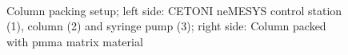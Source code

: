 \begin{figure}[h]
          \begin{subfigure}{0.49\textwidth}
                  \flushleft
          \end{subfigure}\hfill
        \begin{subfigure}{0.49\textwidth}
                \flushright
        \end{subfigure}
        \\
        
        \caption[Column packing setup]{Column packing setup; left side: CETONI neMESYS control station (1), column (2) and syringe pump (3); right side: Column packed with \gls{pmma} matrix material }
        \label{fig:Packing_Setup_Column}
  \end{figure}  




